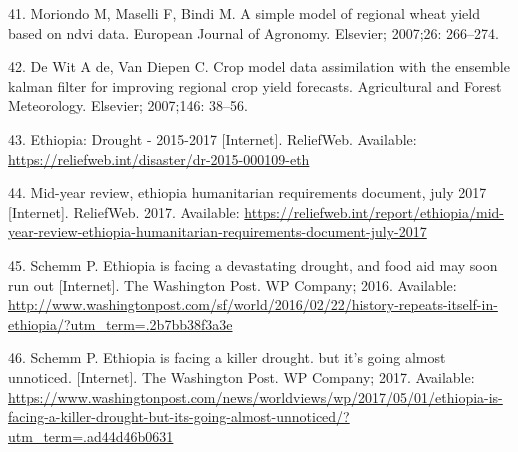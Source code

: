 \documentclass[10pt,letterpaper]{article}
\begin{document}
\hypertarget{ref-moriondo2007simple}{}
41. Moriondo M, Maselli F, Bindi M. A simple model of regional wheat
yield based on ndvi data. European Journal of Agronomy. Elsevier;
2007;26: 266--274.

\hypertarget{ref-de2007crop}{}
42. De Wit A de, Van Diepen C. Crop model data assimilation with the
ensemble kalman filter for improving regional crop yield forecasts.
Agricultural and Forest Meteorology. Elsevier; 2007;146: 38--56.

\hypertarget{ref-reliefweb2017}{}
43. Ethiopia: Drought - 2015-2017 {[}Internet{]}. ReliefWeb. Available:
\url{https://reliefweb.int/disaster/dr-2015-000109-eth}

\hypertarget{ref-reliefweb_2017b}{}
44. Mid-year review, ethiopia humanitarian requirements document, july
2017 {[}Internet{]}. ReliefWeb. 2017. Available:
\url{https://reliefweb.int/report/ethiopia/mid-year-review-ethiopia-humanitarian-requirements-document-july-2017}

\hypertarget{ref-schemm_2016}{}
45. Schemm P. Ethiopia is facing a devastating drought, and food aid may
soon run out {[}Internet{]}. The Washington Post. WP Company; 2016.
Available:
\url{http://www.washingtonpost.com/sf/world/2016/02/22/history-repeats-itself-in-ethiopia/?utm_term=.2b7bb38f3a3e}

\hypertarget{ref-schemm_2017}{}
46. Schemm P. Ethiopia is facing a killer drought. but it's going almost
unnoticed. {[}Internet{]}. The Washington Post. WP Company; 2017.
Available:
\url{https://www.washingtonpost.com/news/worldviews/wp/2017/05/01/ethiopia-is-facing-a-killer-drought-but-its-going-almost-unnoticed/?utm_term=.ad44d46b0631}

\nolinenumbers
\end{document}
